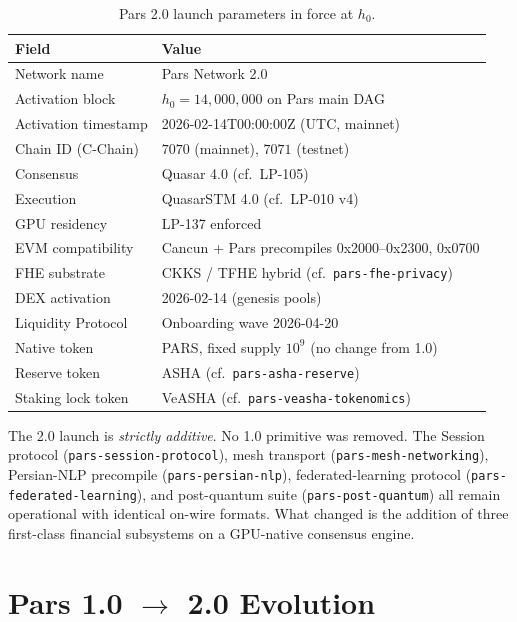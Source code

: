 \documentclass[11pt,a4paper]{article}
\begin{document}
\begin{table}[H]
\centering
\small
\begin{tabularx}{\textwidth}{lX}
\toprule
\textbf{Field} & \textbf{Value} \\
\midrule
Network name & Pars Network 2.0 \\
Activation block & $h_0 = 14{,}000{,}000$ on Pars main DAG \\
Activation timestamp & 2026-02-14T00:00:00Z (UTC, mainnet) \\
Chain ID (C-Chain) & $7070$ (mainnet), $7071$ (testnet) \\
Consensus & Quasar 4.0 (cf.\ LP-105) \\
Execution & QuasarSTM 4.0 (cf.\ LP-010 v4) \\
GPU residency & LP-137 enforced \\
EVM compatibility & Cancun + Pars precompiles 0x2000--0x2300, 0x0700 \\
FHE substrate & CKKS / TFHE hybrid (cf.\ \texttt{pars-fhe-privacy}) \\
DEX activation & 2026-02-14 (genesis pools) \\
Liquidity Protocol & Onboarding wave 2026-04-20 \\
Native token & PARS, fixed supply $10^9$ (no change from 1.0) \\
Reserve token & ASHA (cf.\ \texttt{pars-asha-reserve}) \\
Staking lock token & VeASHA (cf.\ \texttt{pars-veasha-tokenomics}) \\
\bottomrule
\end{tabularx}
\caption{Pars 2.0 launch parameters in force at $h_0$.}
\end{table}

The 2.0 launch is \emph{strictly additive}. No 1.0 primitive was removed.
The Session protocol (\texttt{pars-session-protocol}), mesh transport
(\texttt{pars-mesh-networking}), Persian-NLP precompile
(\texttt{pars-persian-nlp}), federated-learning protocol
(\texttt{pars-federated-learning}), and post-quantum suite
(\texttt{pars-post-quantum}) all remain operational with identical
on-wire formats. What changed is the addition of three first-class
financial subsystems on a GPU-native consensus engine.

\section{Pars 1.0 $\to$ 2.0 Evolution}
\label{sec:evolution}
\end{document}
